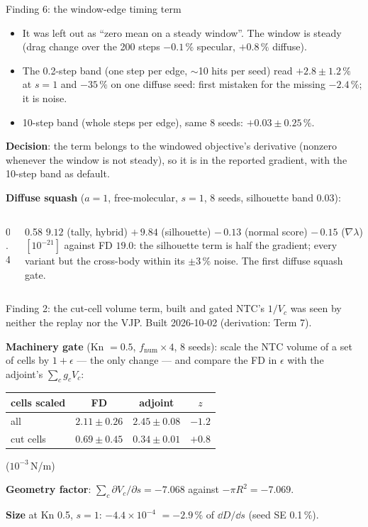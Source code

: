 \documentclass[10pt,aspectratio=169]{beamer}
\begin{document}
\begin{frame}{Finding 6: the window-edge timing term}
\small
\begin{itemize}
\item It was left out as ``zero mean on a steady window''.  The window is steady (drag change over the
  200 steps $-0.1\,\%$ specular, $+0.8\,\%$ diffuse).
\item The 0.2-step band (one step per edge, $\sim$10 hits per seed) read $+2.8\pm1.2\,\%$ at $s = 1$ and
  $-35\,\%$ on one diffuse seed: first mistaken for the missing $-2.4\,\%$; it is noise.
\item 10-step band (whole steps per edge), same 8 seeds: $+0.03\pm0.25\,\%$.
\end{itemize}
\textbf{Decision}: the term belongs to the windowed objective's derivative (nonzero whenever the
window is not steady), so it is in the reported gradient, with the 10-step band as default.

\vspace{1em}
\textbf{Diffuse squash} ($a = 1$, free-molecular, $s = 1$, 8 seeds, silhouette band 0.03):
\begin{columns}[T]
\begin{column}{0.4\textwidth}
\footnotesize
\end{column}
\begin{column}{0.58\textwidth}
\footnotesize
$9.12$ (tally, hybrid) $+\,9.84$ (silhouette) $-\,0.13$ (normal score) $-\,0.15$ ($\nabla\lambda$)
$[10^{-21}]$ against FD $19.0$: the silhouette term is half the gradient; every variant but the
cross-body  within its $\pm3\,\%$ noise.  The first diffuse squash gate.
\end{column}
\end{columns}
\end{frame}

\begin{frame}{Finding 2: the cut-cell volume term, built and gated}
\small
NTC's $1/V_c$ was seen by neither the replay nor the VJP.  Built 2026-10-02 (derivation: Term 7).

\textbf{Machinery gate} (Kn $= 0.5$, $f_{\mathrm{num}}\times4$, 8 seeds): scale the NTC volume of a set of
cells by $1+\epsilon$ --- the only change --- and compare the FD in $\epsilon$ with the adjoint's
$\sum_c g_c V_c$:
\begin{center}
\begin{tabular}{@{}lccc@{}}
\toprule
cells scaled & FD & adjoint & $z$\\
\midrule
all & $2.11\pm0.26$ & $2.45\pm0.08$ & $-1.2$\\
cut cells & $0.69\pm0.45$ & $0.34\pm0.01$ & $+0.8$\\
\bottomrule
\end{tabular}
\quad ($10^{-3}$\,N/m)
\end{center}
\textbf{Geometry factor}: $\sum_c\partial V_c/\partial s = -7.068$ against $-\pi R^2 = -7.069$.

\textbf{Size} at Kn 0.5, $s = 1$: $-4.4\times10^{-4}$ $= -2.9\,\%$ of $\dd D/\dd s$ (seed SE 0.1\,\%).
\end{frame}
\end{document}
